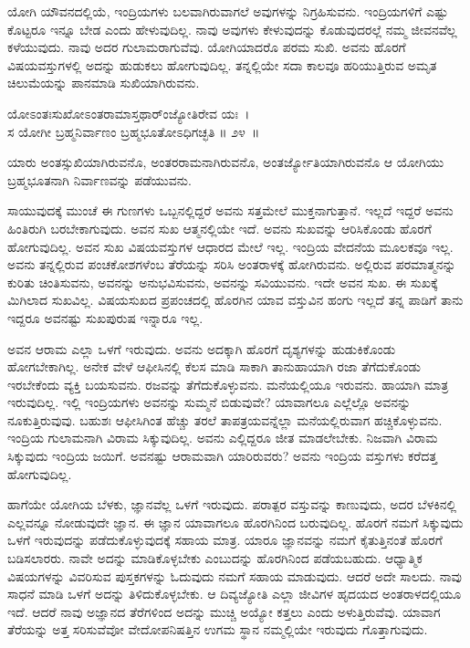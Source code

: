 ಯೋಗಿ ಯೌವನದಲ್ಲಿಯೆ, ಇಂದ್ರಿಯಗಳು ಬಲವಾಗಿರುವಾಗಲೆ ಅವುಗಳನ್ನು ನಿಗ್ರಹಿ\-ಸುವನು. ಇಂದ್ರಿಯಗಳಿಗೆ ಎಷ್ಟು ಕೊಟ್ಟರೂ ಇನ್ನೂ ಬೇಡ ಎಂದು ಹೇಳುವುದಿಲ್ಲ. ನಾವು ಅವುಗಳು ಕೇಳುವುದನ್ನು ಕೊಡುವುದರಲ್ಲೆ ನಮ್ಮ ಜೀವನವೆಲ್ಲ ಕಳೆಯುವುದು. ನಾವು ಅದರ ಗುಲಾಮರಾಗುವೆವು. ಯೋಗಿಯಾದರೊ ಪರಮ ಸುಖಿ. ಅವನು ಹೊರಗೆ ವಿಷಯವಸ್ತುಗಳಲ್ಲಿ ಅದನ್ನು ಹುಡುಕಲು ಹೋಗುವುದಿಲ್ಲ. ತನ್ನಲ್ಲಿಯೇ ಸದಾ ಕಾಲವೂ ಹರಿಯುತ್ತಿರುವ ಅಮೃತ ಚಿಲುಮೆಯನ್ನು ಪಾನಮಾಡಿ ಸುಖಿಯಾಗಿರುವನು.

\begin{shloka}
ಯೋಽಂತಃಸುಖೋಽಂತರಾಮಾಸ್ತಥಾರ್ಂಜ್ಯೋತಿರೇವ ಯಃ~।\\ಸ ಯೋಗೀ ಬ್ರಹ್ಮನಿರ್ವಾಣಂ ಬ್ರಹ್ಮಭೂತೋಽಧಿಗಚ್ಛತಿ \hfill॥ ೨೪~॥
\end{shloka}

\begin{artha}
ಯಾರು ಅಂತಸ್ಸುಖಿಯಾಗಿರುವನೊ, ಅಂತರರಾಮನಾಗಿರುವನೊ, ಅಂತರ್ಜ್ಯೋತಿಯಾಗಿರುವನೊ ಆ ಯೋಗಿಯು ಬ್ರಹ್ಮಭೂತನಾಗಿ ನಿರ್ವಾಣವನ್ನು ಪಡೆಯುವನು.
\end{artha}

ಸಾಯುವುದಕ್ಕೆ ಮುಂಚೆ ಈ ಗುಣಗಳು ಒಬ್ಬನಲ್ಲಿದ್ದರೆ ಅವನು ಸತ್ತಮೇಲೆ ಮುಕ್ತನಾಗುತ್ತಾನೆ. ಇಲ್ಲದೆ ಇದ್ದರೆ ಅವನು ಹಿಂತಿರುಗಿ ಬರಬೇಕಾಗುವುದು. ಅವನ ಸುಖ ಆತ್ಮನಲ್ಲಿಯೇ ಇದೆ. ಅವನು ಸುಖವನ್ನು ಆರಿಸಿಕೊಂಡು ಹೊರಗೆ ಹೋಗುವುದಿಲ್ಲ. ಅವನ ಸುಖ ವಿಷಯವಸ್ತುಗಳ ಆಧಾರದ ಮೇಲೆ ಇಲ್ಲ. ಇಂದ್ರಿಯ ವೇದನೆಯ ಮೂಲಕವೂ ಇಲ್ಲ. ಅವನು ತನ್ನಲ್ಲಿರುವ ಪಂಚಕೋಶಗಳೆಂಬ ತೆರೆಯನ್ನು ಸರಿಸಿ ಅಂತರಾಳಕ್ಕೆ ಹೋಗಿರುವನು. ಅಲ್ಲಿರುವ ಪರಮಾತ್ಮನನ್ನು ಕುರಿತು ಚಿಂತಿಸುವನು, ಅವನನ್ನು ಅನುಭವಿಸುವನು, ಅವನನ್ನು ಸವಿಯುವನು. ಇದೇ ಅವನ ಸುಖ. ಈ ಸುಖಕ್ಕೆ ಮಿಗಿಲಾದ ಸುಖವಿಲ್ಲ. ವಿಷಯಸುಖದ ಪ್ರಪಂಚದಲ್ಲಿ ಹೊರಗಿನ ಯಾವ ವಸ್ತುವಿನ ಹಂಗು ಇಲ್ಲದೆ ತನ್ನ ಪಾಡಿಗೆ ತಾನು ಇದ್ದರೂ ಅವನಷ್ಟು ಸುಖಪುರುಷ ಇನ್ನಾರೂ ಇಲ್ಲ.

ಅವನ ಆರಾಮ ಎಲ್ಲಾ ಒಳಗೆ ಇರುವುದು. ಅವನು ಅದಕ್ಕಾಗಿ ಹೊರಗೆ ದೃಶ್ಯಗಳನ್ನು ಹುಡುಕಿಕೊಂಡು ಹೋಗಬೇಕಾಗಿಲ್ಲ. ಅನೇಕ ವೇಳೆ ಆಫೀಸಿನಲ್ಲಿ ಕೆಲಸ ಮಾಡಿ ಸಾಕಾಗಿ ತಾನು\break ಹಾಯಾಗಿ ರಜಾ ತೆಗೆದುಕೊಂಡು ಇರಬೇಕೆಂದು ವ್ಯಕ್ತಿ ಬಯಸುವನು. ರಜವನ್ನು ತೆಗೆದು\-ಕೊಳ್ಳುವನು. ಮನೆಯಲ್ಲಿಯೂ ಇರುವನು. ಹಾಯಾಗಿ ಮಾತ್ರ ಇರುವುದಿಲ್ಲ. ಇಲ್ಲಿ ಇಂದ್ರಿಯಗಳು ಅವನನ್ನು ಸುಮ್ಮನೆ ಬಿಡುವುವೇ? ಯಾವಾಗಲೂ ಎಲ್ಲೆಲ್ಲೊ ಅವನನ್ನು ನೂಕುತ್ತಿರುವುವು. ಬಹುಶಃ ಆಫೀಸಿಗಿಂತ ಹೆಚ್ಚು ತರಲೆ ತಾಪತ್ರಯವನ್ನೆಲ್ಲಾ ಮನೆಯಲ್ಲಿರುವಾಗ ಹಚ್ಚಿಕೊಳ್ಳುವನು. ಇಂದ್ರಿಯ ಗುಲಾಮನಾಗಿ ವಿರಾಮ ಸಿಕ್ಕುವುದಿಲ್ಲ. ಅವನು ಎಲ್ಲಿದ್ದರೂ ಜೀತ ಮಾಡಲೇಬೇಕು. ನಿಜವಾಗಿ ವಿರಾಮ ಸಿಕ್ಕುವುದು ಇಂದ್ರಿಯ ಜಯಿಗೆ. ಅವನಷ್ಟು ಆರಾಮವಾಗಿ ಯಾರಿರುವರು? ಅವನು ಇಂದ್ರಿಯ ವಸ್ತುಗಳು ಕರೆದತ್ತ ಹೋಗುವುದಿಲ್ಲ.

ಹಾಗೆಯೇ ಯೋಗಿಯ ಬೆಳಕು, ಜ್ಞಾನವೆಲ್ಲ ಒಳಗೆ ಇರುವುದು. ಪರಾತ್ಪರ ವಸ್ತುವನ್ನು ಕಾಣುವುದು, ಅದರ ಬೆಳಕಿನಲ್ಲಿ ಎಲ್ಲವನ್ನೂ ನೋಡುವುದೇ ಜ್ಞಾನ. ಈ ಜ್ಞಾನ ಯಾವಾಗಲೂ ಹೊರಗಿನಿಂದ ಬರುವುದಿಲ್ಲ. ಹೊರಗೆ ನಮಗೆ ಸಿಕ್ಕುವುದು ಒಳಗೆ ಇರುವುದನ್ನು ಪಡೆದುಕೊಳ್ಳುವುದಕ್ಕೆ ಸಹಾಯ ಮಾತ್ರ. ಯಾರೂ ಜ್ಞಾನವನ್ನು ನಮಗೆ ಕೈತುತ್ತಿನಂತೆ ಹೊರಗೆ ಬಡಿಸಲಾರರು. ನಾವೇ ಅದನ್ನು ಮಾಡಿಕೊಳ್ಳಬೇಕು ಎಂಬುದನ್ನು ಹೊರಗಿನಿಂದ ಪಡೆಯಬಹುದು. ಆಧ್ಯಾತ್ಮಿಕ ವಿಷಯಗಳನ್ನು ವಿವರಿಸುವ ಪುಸ್ತಕಗಳನ್ನು ಓದುವುದು ನಮಗೆ ಸಹಾಯ ಮಾಡುವುದು. ಆದರೆ ಅದೇ ಸಾಲದು. ನಾವು ಸಾಧನೆ ಮಾಡಿ ಒಳಗೆ ಅದನ್ನು ತಿಳಿದುಕೊಳ್ಳಬೇಕು. ಆ ದಿವ್ಯಜ್ಯೋತಿ ಎಲ್ಲಾ ಜೀವಿಗಳ ಹೃದಯದ ಅಂತರಾಳದಲ್ಲಿಯೂ ಇದೆ. ಆದರೆ ನಾವು ಅಜ್ಞಾನದ ತೆರೆಗಳಿಂದ ಅದನ್ನು ಮುಚ್ಚಿ ಅಯ್ಯೋ ಕತ್ತಲು ಎಂದು ಅಳುತ್ತಿರುವೆವು. ಯಾವಾಗ ತೆರೆಯನ್ನು ಅತ್ತ ಸರಿಸುವೆವೋ ವೇದೋಪನಿಷತ್ತಿನ ಉಗಮ ಸ್ಥಾನ ನಮ್ಮಲ್ಲಿಯೇ ಇರುವುದು ಗೊತ್ತಾಗುವುದು.

